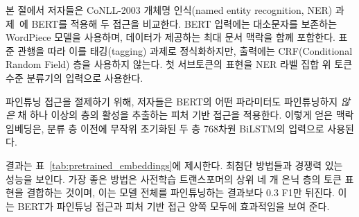 본 절에서 저자들은 CoNLL-2003 개체명 인식(named entity recognition, NER) 과제~\cite{tjong-de:2003}에 BERT를 적용해 두 접근을 비교한다. BERT 입력에는 대소문자를 보존하는 WordPiece 모델을 사용하며, 데이터가 제공하는 최대 문서 맥락을 함께 포함한다. 표준 관행을 따라 이를 태깅(tagging) 과제로 정식화하지만, 출력에는 CRF(Conditional Random Field) 층을 사용하지 않는다. 첫 서브토큰의 표현을 NER 라벨 집합 위 토큰 수준 분류기의 입력으로 사용한다.


파인튜닝 접근을 절제하기 위해, 저자들은 BERT의 어떤 파라미터도 파인튜닝하지 \emph{않은} 채 하나 이상의 층의 활성을 추출하는 피처 기반 접근을 적용한다. 이렇게 얻은 맥락 임베딩은, 분류 층 이전에 무작위 초기화된 두 층 768차원 BiLSTM의 입력으로 사용된다.

결과는 표~\ref{tab:pretrained_embeddings}에 제시한다.  최첨단 방법들과 경쟁력 있는 성능을 보인다. 가장 좋은 방법은 사전학습 트랜스포머의 상위 네 개 은닉 층의 토큰 표현을 결합하는 것이며, 이는 모델 전체를 파인튜닝하는 결과보다 0.3 F1만 뒤진다. 이는 BERT가 파인튜닝 접근과 피처 기반 접근 양쪽 모두에 효과적임을 보여 준다.



